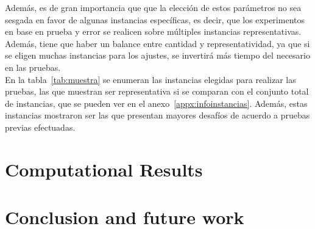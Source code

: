 \documentclass[10pt, conference, compsocconf]{IEEEtran}
\begin{document}
  Además, es de gran importancia que que la elección de estos parámetros no sea sesgada en favor de algunas instancias específicas, es decir, que los experimentos en base en prueba y error se realicen sobre múltiples instancias representativas. Además, tiene que haber un balance entre cantidad y representatividad, ya que si se eligen muchas instancias para los ajustes, se invertirá más tiempo del necesario en las pruebas. \\



  En la tabla~\ref{tab:muestra} se enumeran las instancias elegidas para realizar las pruebas, las que muestran ser representativa si se comparan con el conjunto total de instancias, que se pueden ver en el anexo~\ref{appx:infoinstancias}. Además, estas instancias mostraron ser las que presentan mayores desafíos de acuerdo a pruebas previas efectuadas.\\




\section{Computational Results}
\section{Conclusion and future work}






%
%
\end{document}
